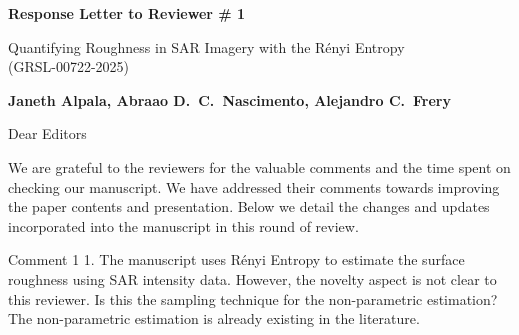 \documentclass[11pt]{report}
\begin{document}
\begin{center}
\large{\textbf{Response Letter to Reviewer \# 1}}

\vglue 0.3cm

\huge{ Quantifying Roughness in SAR Imagery with the Rényi Entropy\\ (GRSL-00722-2025)}
\end{center}

\begin{center}
\textbf{Janeth Alpala,   Abraao D.\ C.\ Nascimento, Alejandro C.\ Frery  }
\end{center}

\date{\today}



\vspace{0.5cm}
\noindent Dear Editors
\bigskip

\noindent We are grateful to the reviewers for the valuable comments and the time spent on checking our manuscript. 
We have addressed their comments towards improving the paper contents and presentation. 
Below we detail the changes and updates incorporated into the manuscript in this round of review.

\medskip


\begin{reviewbox}{Comment 1}
1. The manuscript uses Rényi Entropy to estimate the surface roughness using SAR intensity data. However, the novelty aspect is not clear to this reviewer. Is this the sampling technique for the non-parametric estimation? The non-parametric estimation is already existing in the literature.

\end{reviewbox}
\end{document}
